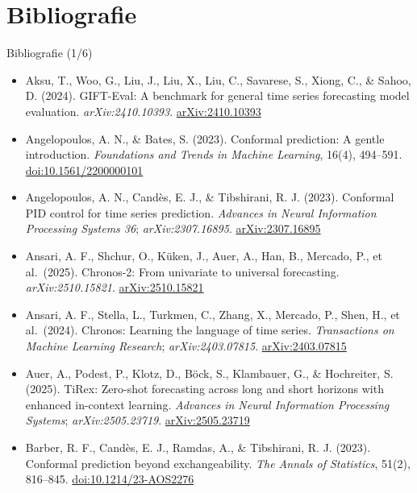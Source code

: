 \section{Bibliografie}

\begin{frame}{Bibliografie (1/6)}
\itemsize{\tiny}
\begin{itemize}
    \item Aksu, T., Woo, G., Liu, J., Liu, X., Liu, C., Savarese, S., Xiong, C., \& Sahoo, D. (2024). GIFT-Eval: A benchmark for general time series forecasting model evaluation. \textit{arXiv:2410.10393}. \href{https://arxiv.org/abs/2410.10393}{arXiv:2410.10393}
    \item Angelopoulos, A. N., \& Bates, S. (2023). Conformal prediction: A gentle introduction. \textit{Foundations and Trends in Machine Learning}, 16(4), 494--591. \href{https://doi.org/10.1561/2200000101}{doi:10.1561/2200000101}
    \item Angelopoulos, A. N., Candès, E. J., \& Tibshirani, R. J. (2023). Conformal PID control for time series prediction. \textit{Advances in Neural Information Processing Systems 36}; \textit{arXiv:2307.16895}. \href{https://arxiv.org/abs/2307.16895}{arXiv:2307.16895}
    \item Ansari, A. F., Shchur, O., Küken, J., Auer, A., Han, B., Mercado, P., et al.\ (2025). Chronos-2: From univariate to universal forecasting. \textit{arXiv:2510.15821}. \href{https://arxiv.org/abs/2510.15821}{arXiv:2510.15821}
    \item Ansari, A. F., Stella, L., Turkmen, C., Zhang, X., Mercado, P., Shen, H., et al.\ (2024). Chronos: Learning the language of time series. \textit{Transactions on Machine Learning Research}; \textit{arXiv:2403.07815}. \href{https://arxiv.org/abs/2403.07815}{arXiv:2403.07815}
    \item Auer, A., Podest, P., Klotz, D., Böck, S., Klambauer, G., \& Hochreiter, S. (2025). TiRex: Zero-shot forecasting across long and short horizons with enhanced in-context learning. \textit{Advances in Neural Information Processing Systems}; \textit{arXiv:2505.23719}. \href{https://arxiv.org/abs/2505.23719}{arXiv:2505.23719}
    \item Barber, R. F., Candès, E. J., Ramdas, A., \& Tibshirani, R. J. (2023). Conformal prediction beyond exchangeability. \textit{The Annals of Statistics}, 51(2), 816--845. \href{https://doi.org/10.1214/23-AOS2276}{doi:10.1214/23-AOS2276}

\end{itemize}
\end{frame}
